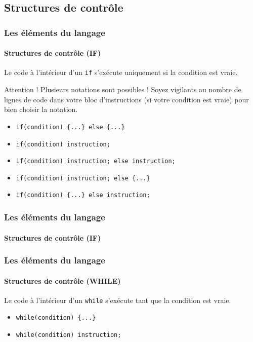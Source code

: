 	\subsection{Structures de contrôle}
	
		\begin{frame}[fragile]
			\frametitle{Les éléments du langage}
			\framesubtitle{Structures de contrôle (IF)}
			\begin{fact}
				Le code à l'intérieur d'un \lstinline|if| s'exécute uniquement si la condition est vraie.
			\end{fact}
			\pause{}
			\begin{alertblock}{Attention !}
				Plusieurs notations sont possibles ! Soyez vigilants au nombre de lignes de code dans votre bloc d'instructions (si votre condition est vraie) pour bien choisir la notation.
			\end{alertblock}
			\pause{}
			\begin{syntaxe}
				\begin{itemize}[<+->]
					\item \lstinline|if(condition) {...} else {...}|
					\item \lstinline|if(condition) instruction;|
					\item \lstinline|if(condition) instruction; else instruction;|
					\item \lstinline|if(condition) instruction; else {...}|
					\item \lstinline|if(condition) {...} else instruction;|
				\end{itemize}
			\end{syntaxe}
		\end{frame}
	
		\begin{frame}[fragile]
			\frametitle{Les éléments du langage}
			\framesubtitle{Structures de contrôle (IF)}
			\begin{example}
				
			\end{example}
		\end{frame}
	
		\begin{frame}[fragile]
			\frametitle{Les éléments du langage}
			\framesubtitle{Structures de contrôle (WHILE)}
			\begin{fact}
				Le code à l'intérieur d'un \lstinline|while| s'exécute tant que la condition est vraie.
			\end{fact}
			\pause{}
			\begin{syntaxe}
				\begin{itemize}
					\item \lstinline|while(condition) {...}|
					\item \lstinline|while(condition) instruction;|
				\end{itemize}
			\end{syntaxe}
			\pause{}
			\begin{example}
				
			\end{example}
		\end{frame}
	
